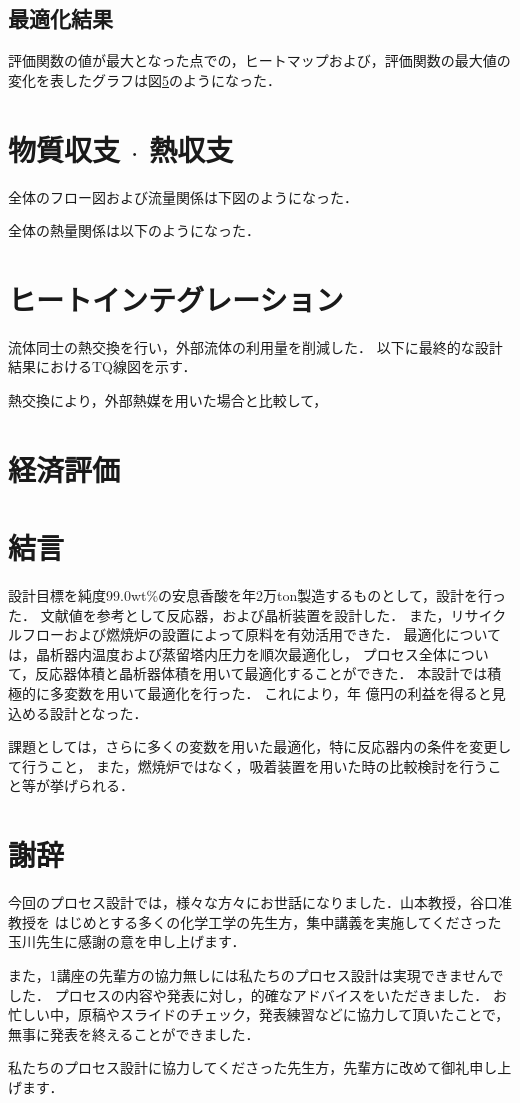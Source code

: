 \documentclass[a4j]{jsreport}
\begin{document}
\section{最適化結果}
評価関数の値が最大となった点での，ヒートマップおよび，評価関数の最大値の変化を表したグラフは図\ref{}のようになった．


\newpage
\chapter{物質収支 $\cdot$ 熱収支}
全体のフロー図および流量関係は下図のようになった．

全体の熱量関係は以下のようになった．

\newpage
\chapter{ヒートインテグレーション}
流体同士の熱交換を行い，外部流体の利用量を削減した．
以下に最終的な設計結果におけるTQ線図を示す．

熱交換により，外部熱媒を用いた場合と比較して，

\newpage
\chapter{経済評価}

\newpage
\chapter{結言}
設計目標を純度99.0wt\%の安息香酸を年2万ton製造するものとして，設計を行った．
文献値を参考として反応器，および晶析装置を設計した．
また，リサイクルフローおよび燃焼炉の設置によって原料を有効活用できた．
最適化については，晶析器内温度および蒸留塔内圧力を順次最適化し，
プロセス全体について，反応器体積と晶析器体積を用いて最適化することができた．
本設計では積極的に多変数を用いて最適化を行った．
これにより，年 億円の利益を得ると見込める設計となった．
\par
課題としては，さらに多くの変数を用いた最適化，特に反応器内の条件を変更して行うこと，
また，燃焼炉ではなく，吸着装置を用いた時の比較検討を行うこと等が挙げられる．

\newpage
\chapter*{謝辞}
今回のプロセス設計では，様々な方々にお世話になりました．山本教授，谷口准教授を
はじめとする多くの化学工学の先生方，集中講義を実施してくださった玉川先生に感謝の意を申し上げます．
\par
また，1講座の先輩方の協力無しには私たちのプロセス設計は実現できませんでした．
プロセスの内容や発表に対し，的確なアドバイスをいただきました．
お忙しい中，原稿やスライドのチェック，発表練習などに協力して頂いたことで，無事に発表を終えることができました．
\par
私たちのプロセス設計に協力してくださった先生方，先輩方に改めて御礼申し上げます．
\end{document}

